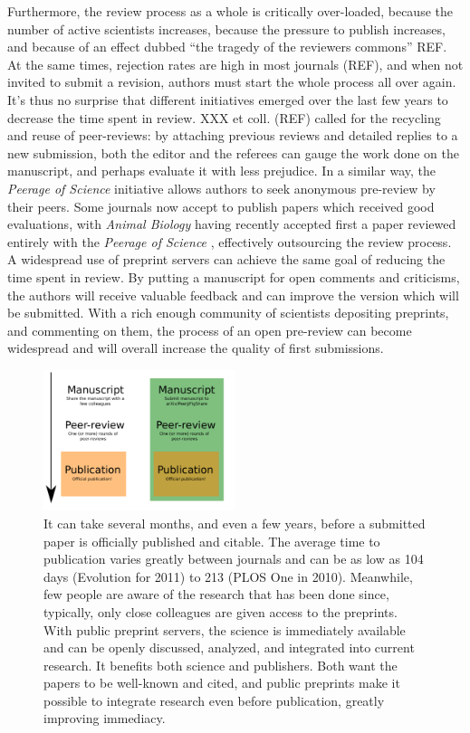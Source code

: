 \documentclass[letterpaper,twocolumn,superscriptaddress,showkeys]{revtex4-1}
\begin{document}
Furthermore, the review process as a whole is critically over-loaded, because
the number of active scientists increases, because the pressure to publish
increases, and because of an effect dubbed ``the tragedy of the reviewers
commons'' REF.  At the same times, rejection rates are high in most journals
(REF), and when not invited to submit a revision, authors must start the whole
process all over again. It's thus no surprise that different initiatives emerged
over the last few years to decrease the time spent in review. XXX et coll.
(REF) called for the recycling and reuse of peer-reviews: by attaching previous
reviews and detailed replies to a new submission, both the editor and the
referees can gauge the work done on the manuscript, and perhaps evaluate it with
less prejudice. In a similar way, the \emph{Peerage of Science} initiative
allows authors to seek anonymous pre-review by their peers. Some journals now
accept to publish papers which received good evaluations, with \emph{Animal
Biology} having recently accepted first a paper reviewed entirely with the
\emph{Peerage of Science} \cite{abb12}, effectively outsourcing the review
process. A widespread use of preprint servers can achieve the same goal of
reducing the time spent in review. By putting a manuscript for open comments and
criticisms, the authors will receive valuable feedback and can improve the
version which will be submitted. With a rich enough community of scientists
depositing preprints, and commenting on them, the process of an open pre-review
can become widespread and will overall increase the quality of first
submissions.

\begin{figure}[ht!] \centering\includegraphics[width=0.50\textwidth]{map.pdf}
\caption { It can take several months, and even a few years, before a submitted
paper is officially published and citable.  The average time to publication
varies greatly between journals and can be as low as 104 days (Evolution for
2011) to 213 (PLOS One in 2010).  Meanwhile, few people are aware of the
research that has been done since, typically, only close colleagues are given
access to the preprints. With public preprint servers, the science is
immediately available and can be openly discussed, analyzed, and integrated into
current research. It benefits both science and publishers. Both want the papers
to be well-known and cited, and public preprints make it possible to integrate
research even before publication, greatly improving immediacy.  }
\label{fig:map} \end{figure}
\end{document}
